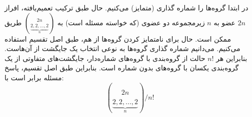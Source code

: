 در ابتدا گروه‌ها را شماره گذاری
(متمایز)
می‌کنیم.
حال طبق ترکیب تعمیم‌یافته، افراز
$2n$
عضو به
$n$
زیرمجموعه دو عضوی (که خواسته مسئله است) به
${2n \choose \underbrace{2,2,...,2}_n}$
طریق ممکن است.
حال برای نامتمایز کردن گروه‌ها از هم، طبق اصل تقسیم استفاده می‌کنیم.
می‌دانیم شماره گذاری گروه‌ها به نوعی انتخاب یک جایگشت از آن‌هاست.
بنابراین هر
$n!$
حالت از گروه‌بندی با گروه‌های شماره‌دار، جایگشت‌های متفاوتی از
یک گروه‌بندی یکسان با گروه‌های بدون شماره است.
بنابراین طبق اصل تقسیم، پاسخ مسئله برابر است با:
$${2n \choose \underbrace{2,2,...,2}_n}/n!$$
